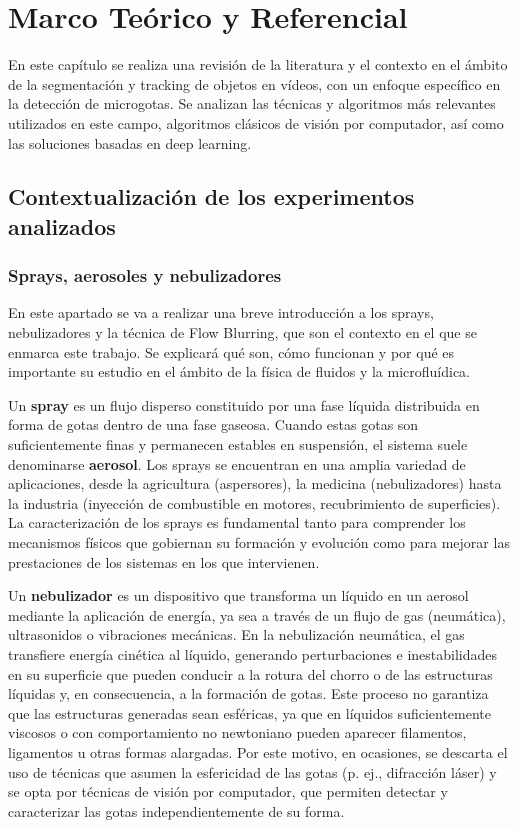
\chapter{Marco Teórico y Referencial}\label{cap:marcoTeorico}

En este capítulo se realiza una revisión de la literatura y el contexto en el ámbito de la segmentación y tracking de objetos en vídeos, con un enfoque específico en la detección de microgotas. Se analizan las técnicas y algoritmos más relevantes utilizados en este campo, algoritmos clásicos de visión por computador, así como las soluciones basadas en deep learning.

\section {Contextualización de los experimentos analizados}

\subsection{Sprays, aerosoles y nebulizadores}

En este apartado se va a realizar una breve introducción a los sprays, nebulizadores y la técnica de Flow Blurring, que son el contexto en el que se enmarca este trabajo. Se explicará qué son, cómo funcionan y por qué es importante su estudio en el ámbito de la física de fluidos y la microfluídica.

Un \textbf{spray} es un flujo disperso constituido por una fase líquida distribuida en forma de gotas dentro de una fase gaseosa. Cuando estas gotas son suficientemente finas y permanecen estables en suspensión, el sistema suele denominarse \textbf{aerosol}. Los sprays se encuentran en una amplia variedad de aplicaciones, desde la agricultura (aspersores), la medicina (nebulizadores) hasta la industria (inyección de combustible en motores, recubrimiento de superficies). La caracterización de los sprays es fundamental tanto para comprender los mecanismos físicos que gobiernan su formación y evolución como para mejorar las prestaciones de los sistemas en los que intervienen.

Un \textbf{nebulizador} es un dispositivo que transforma un líquido en un aerosol mediante la aplicación de energía, ya sea a través de un flujo de gas (neumática), ultrasonidos o vibraciones mecánicas. En la nebulización neumática, el gas transfiere energía cinética al líquido, generando perturbaciones e inestabilidades en su superficie que pueden conducir a la rotura del chorro o de las estructuras líquidas y, en consecuencia, a la formación de gotas. Este proceso no garantiza que las estructuras generadas sean esféricas, ya que en líquidos suficientemente viscosos o con comportamiento no newtoniano pueden aparecer filamentos, ligamentos u otras formas alargadas. Por este motivo, en ocasiones, se descarta el uso de técnicas que asumen la esfericidad de las gotas (p. ej., difracción láser) y se opta por técnicas de visión por computador, que permiten detectar y caracterizar las gotas independientemente de su forma.

